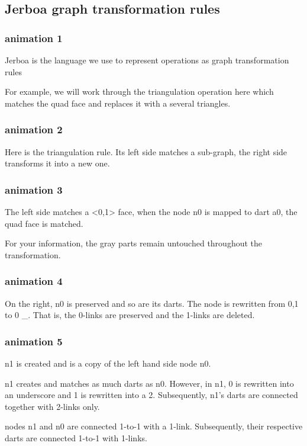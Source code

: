 \documentclass[11pt]{article}
\begin{document}
\subsection{Jerboa graph transformation rules}
\label{sec:org700b51e}
\subsubsection{animation 1}
\label{sec:org7e86925}
Jerboa is the language we use to represent operations as graph transformation
rules

For example, we will work through the triangulation operation here which matches
the quad face and replaces it with a several triangles.
\subsubsection{animation 2}
\label{sec:orgdcbccc7}
Here is the triangulation rule.
Its left side matches a sub-graph, the right side transforms it into a new one.

\subsubsection{animation 3}
\label{sec:org5c9835a}
The left side matches a <0,1> face, when the node n0 is mapped to dart a0, the
quad face is matched.

For your information, the gray parts remain untouched throughout the
transformation.

\subsubsection{animation 4}
\label{sec:org80b8cb9}
On the right, n0 is preserved and so are its darts. The node is rewritten from
0,1 to 0 \_. That is, the 0-links are preserved and the 1-links are deleted.

\subsubsection{animation 5}
\label{sec:org6ecc4e0}

n1 is created and is a copy of the left hand side node n0.

n1 creates and matches as much darts as n0. However, in n1, 0 is rewritten into
an underscore and 1 is rewritten into a 2. Subsequently, n1's darts are
connected together with 2-links only.

nodes n1 and n0 are connected 1-to-1 with a 1-link. Subsequently, their
respective darts are connected 1-to-1 with 1-links.
\end{document}
